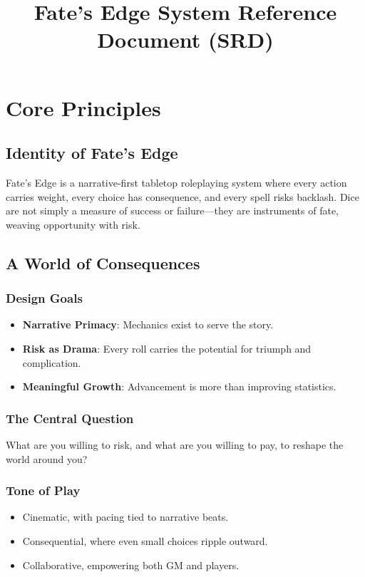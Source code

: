 \documentclass[11pt]{article}
\title{Fate's Edge System Reference Document (SRD)}
\author{}
\date{}
\begin{document}
\maketitle
\tableofcontents
\newpage

\section{Core Principles}

\subsection{Identity of Fate's Edge}
Fate's Edge is a narrative-first tabletop roleplaying system where every action carries weight, every choice has consequence, and every spell risks backlash. Dice are not simply a measure of success or failure—they are instruments of fate, weaving opportunity with risk.

\subsection{A World of Consequences}

\subsubsection{Design Goals}
\begin{itemize}
    \item \textbf{Narrative Primacy}: Mechanics exist to serve the story.
    \item \textbf{Risk as Drama}: Every roll carries the potential for triumph and complication.
    \item \textbf{Meaningful Growth}: Advancement is more than improving statistics.
\end{itemize}

\subsubsection{The Central Question}
What are you willing to risk, and what are you willing to pay, to reshape the world around you?

\subsubsection{Tone of Play}
\begin{itemize}
    \item Cinematic, with pacing tied to narrative beats.
    \item Consequential, where even small choices ripple outward.
    \item Collaborative, empowering both GM and players.
\end{itemize}
\end{document}
